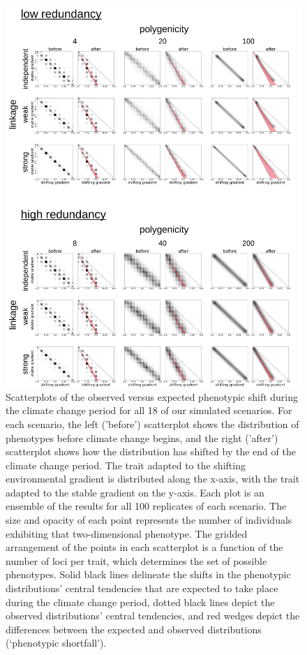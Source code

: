 \documentclass[9pt,twocolumn,twoside,lineno]{new_article}
\begin{document}
\begin{figure}
\centering
\includegraphics[width=15.8cm]{pub/figs_and_stats/FIG_4_phenotypic_shift_ROWLABELS_CORRECTED.png}
\caption{Scatterplots of the observed versus expected phenotypic shift during the climate change period for all 18 of our simulated scenarios. For each scenario, the left ('before') scatterplot shows the distribution of phenotypes before climate change begins, and the right ('after') scatterplot shows how the distribution has shifted by the end of the climate change period. The trait adapted to the shifting environmental gradient is distributed along the x-axis, with the trait adapted to the stable gradient on the y-axis. Each plot is an ensemble of the results for all 100 replicates of each scenario. The size and opacity of each point represents the number of individuals exhibiting that two-dimensional phenotype. The gridded arrangement of the points in each scatterplot is a function of the number of loci per trait, which determines the set of possible phenotypes. Solid black lines delineate the shifts in the phenotypic distributions’ central tendencies that are expected to take place during the climate change period, dotted black lines depict the observed distributions’ central tendencies, and red wedges depict the differences between the expected and observed distributions (‘phenotypic shortfall’).
}
\label{fig:fig_4}
\end{figure}
\end{document}
